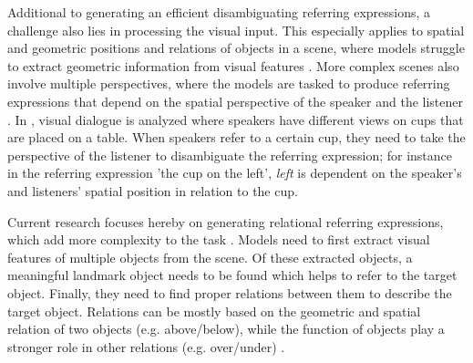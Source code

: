 Additional to generating an efficient disambiguating referring expressions, a challenge also lies in processing the visual input.
This especially applies to spatial and geometric positions and relations of objects in a scene, where models struggle to extract geometric information from visual features \citep{Kelleher2017}.
More complex scenes also involve multiple perspectives, where the models are tasked to produce referring expressions that depend on the spatial perspective of the speaker and the listener \citep{Ahrens2022,Lee2022}.
In \citep{Dobnik2021}, visual dialogue is analyzed where speakers have different views on cups that are placed on a table.
When speakers refer to a certain cup, they need to take the perspective of the listener to disambiguate the referring expression; for instance in the referring expression 'the cup on the left', \emph{left} is dependent on the speaker's and listeners' spatial position in relation to the cup.

Current research focuses hereby on generating relational referring expressions, which add more complexity to the task \citep{Ghanimifard2017,Ghanimifard2019,Ramisa2015,Liu2022a}.
Models need to first extract visual features of multiple objects from the scene.
Of these extracted objects, a meaningful landmark object needs to be found which helps to refer to the target object.
Finally, they need to find proper relations between them to describe the target object.
Relations can be mostly based on the geometric and spatial relation of two objects (e.g. above/below), while the function of objects play a stronger role in other relations (e.g. over/under) \citep{Coventry2005,Dobnik2013}.


